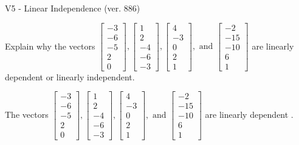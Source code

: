 \begin{exercise}
  \begin{exerciseTitle}V5 - Linear Independence (ver. 886)\end{exerciseTitle}
  \begin{exerciseStatement}
    Explain why the vectors \(\left[\begin{array}{r}
-3 \\
-6 \\
-5 \\
2 \\
0
\end{array}\right] , \left[\begin{array}{r}
1 \\
2 \\
-4 \\
-6 \\
-3
\end{array}\right] , \left[\begin{array}{r}
4 \\
-3 \\
0 \\
2 \\
1
\end{array}\right] , \text{ and } \left[\begin{array}{r}
-2 \\
-15 \\
-10 \\
6 \\
1
\end{array}\right]\) are linearly dependent or linearly independent.	


  \end{exerciseStatement}
  \begin{exerciseAnswer}
   The vectors \(\left[\begin{array}{r}
-3 \\
-6 \\
-5 \\
2 \\
0
\end{array}\right] , \left[\begin{array}{r}
1 \\
2 \\
-4 \\
-6 \\
-3
\end{array}\right] , \left[\begin{array}{r}
4 \\
-3 \\
0 \\
2 \\
1
\end{array}\right] , \text{ and } \left[\begin{array}{r}
-2 \\
-15 \\
-10 \\
6 \\
1
\end{array}\right]\) are 
  	 linearly dependent  .
  


  \end{exerciseAnswer}
\end{exercise}